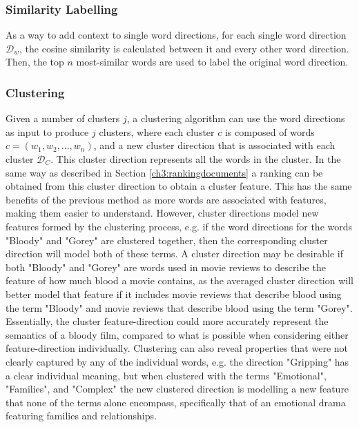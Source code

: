 \subsubsection{Similarity Labelling}\label{ch3:simlabel} 

As a way to add context to single word directions, for each single word direction $\mathcal{D}_w$, the cosine similarity is calculated between it and every other word direction. Then, the top $n$ most-similar words are used to label the original word direction.  %

\subsubsection{Clustering}\label{ch3:clustering}
Given a number of clusters $j$, a clustering algorithm can use the word directions as input to  produce $j$ clusters, where each cluster $c$ is composed of words $c =  (w_1, w_2, ..., w_n)$, and a new cluster direction that is associated with each cluster  $\mathcal{D}_C$. This cluster direction  represents all the words in the cluster. In the same way as described in Section \ref{ch3:rankingdocuments} a ranking can be obtained from this cluster direction to obtain a cluster feature. %
This has the same  benefits of the previous method as more words are associated with features, making them easier to understand. However, cluster directions model new features formed by the clustering process, e.g.  if the word directions for the words "Bloody" and "Gorey" are clustered together, then the corresponding cluster direction will model both of these terms. A cluster direction may be desirable if both "Bloody" and "Gorey" are words used in movie reviews to describe the feature of how much blood a movie contains, as the  averaged cluster direction will better model that feature  if it includes movie reviews that describe blood using the term "Bloody" and movie reviews that describe blood using the term "Gorey".  Essentially, the cluster feature-direction could more accurately represent the semantics of a bloody  film, compared to what is possible when considering either feature-direction individually. Clustering can also reveal properties that were not clearly captured by any of the individual words, e.g. the direction  "Gripping" has a clear individual meaning, but when clustered with the terms  "Emotional", "Families", and "Complex" the new clustered direction is modelling a new feature that none of the terms alone encompass, specifically that of an emotional drama featuring families and relationships.


